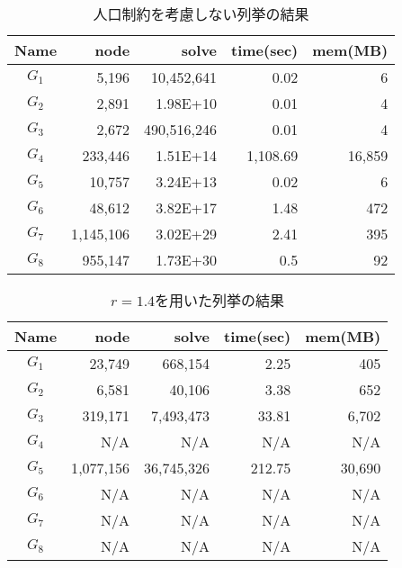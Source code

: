\documentclass[10pt,a4paper,notitlepage,oneside,twocolumn]{abst_jsarticle}
\begin{document}
\begin{table}[htbp]
  \small
  \caption{人口制約を考慮しない列挙の結果}
  \label{table:non_p}
  \centering
  \begin{tabular}{c|rrrr}
    \hline
    Name & node & solve & time(sec) & mem(MB) \\
    \hline \hline
    $G_1$ & 5{,}196 & 10{,}452{,}641 & 0.02 & 6 \\
    $G_2$ & 2{,}891 & 1.98E+10 & 0.01 & 4 \\
    $G_3$ & 2{,}672 & 490{,}516{,}246 & 0.01 & 4 \\
    $G_4$ & 233{,}446 & 1.51E+14 & 1{,}108.69 & 16{,}859 \\
    $G_5$ & 10{,}757 & 3.24E+13 & 0.02 & 6 \\
    $G_6$ & 48{,}612 & 3.82E+17 & 1.48 & 472 \\
    $G_7$ & 1{,}145{,}106 & 3.02E+29 & 2.41 & 395 \\
    $G_8$ & 955{,}147 & 1.73E+30 & 0.5 & 92 \\
    \hline
  \end{tabular}
\end{table}

\begin{table}[htbp]
  \small
  \caption{$r=1.4$を用いた列挙の結果}
  \label{table:result_r}
  \centering
  \begin{tabular}{c|rrrr}
    \hline
    Name & node & solve & time(sec) & mem(MB) \\
    \hline \hline
    $G_1$ & 23{,}749 & 668{,}154 & 2.25 & 405 \\
    $G_2$ & 6{,}581 & 40{,}106 & 3.38 & 652 \\
    $G_3$ & 319{,}171 & 7{,}493{,}473 & 33.81 & 6{,}702 \\
    $G_4$ & N/A & N/A & N/A & N/A \\
    $G_5$ & 1{,}077{,}156 & 36{,}745{,}326 & 212.75 & 30{,}690 \\
    $G_6$ & N/A & N/A & N/A & N/A \\
    $G_7$ & N/A & N/A & N/A & N/A \\
    $G_8$ & N/A & N/A & N/A & N/A \\
    \hline
  \end{tabular}
\end{table}
\end{document}
